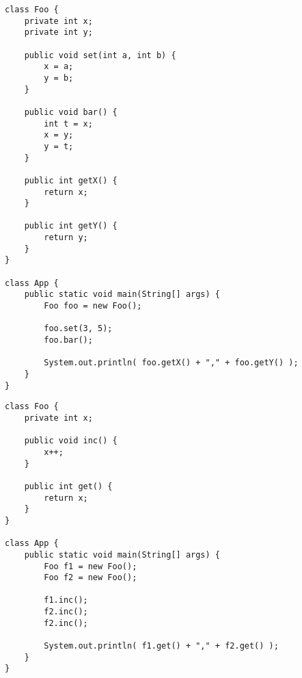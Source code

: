 \documentclass[a4paper]{article}
\begin{document}
\begin{lstlisting}
class Foo {
    private int x;
    private int y;

    public void set(int a, int b) {
        x = a;
        y = b;
    }

    public void bar() {
        int t = x;
        x = y;
        y = t;
    }

    public int getX() {
        return x;
    }

    public int getY() {
        return y;
    }
}

class App {
    public static void main(String[] args) {
        Foo foo = new Foo();

        foo.set(3, 5);
        foo.bar();

        System.out.println( foo.getX() + "," + foo.getY() );
    }
}
\end{lstlisting}\clearpage

\begin{lstlisting}
class Foo {
    private int x;

    public void inc() {
        x++;
    }

    public int get() {
        return x;
    }
}

class App {
    public static void main(String[] args) {
        Foo f1 = new Foo();
        Foo f2 = new Foo();

        f1.inc();
        f2.inc();
        f2.inc();

        System.out.println( f1.get() + "," + f2.get() );
    }
}
\end{lstlisting}\clearpage
\end{document}
